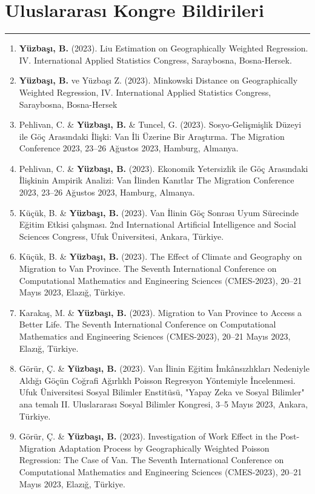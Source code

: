 \documentclass[10pt,a4paper]{article}
\newcommand{\NewPart}[2]{%
	\Needspace{7\baselineskip}%
	\vspace{0.45em}%
	\section*{\sffamily\large\bfseries\color{MidnightBlue}#1 #2}%
	\vspace{-0.7em}\noindent\color{MidnightBlue}\rule{\textwidth}{0.55pt}\color{Black}\vspace{0.25em}}
\newenvironment{etaremune}{\begin{enumerate}}{\end{enumerate}}
\begin{document}
\NewPart{Uluslararası Kongre Bildirileri}{}

\begin{etaremune}
\renewcommand{\theenumi}{C2-\arabic{enumi}}



\item {\bf Y\"{u}zba\c{s}{\i}, B.} (2023). Liu Estimation on Geographically Weighted Regression. IV. International Applied Statistics Congress, Saraybosna, Bosna-Hersek.

\item {\bf Y\"{u}zba\c{s}{\i}, B.} ve Yüzbaşı Z. (2023). Minkowski Distance on Geographically Weighted Regression, IV. International Applied Statistics Congress, Saraybosna, Bosna-Hersek
\item Pehlivan, C. \& {\bf Y\"{u}zba\c{s}{\i}, B.} \& Tuncel, G.  (2023). Sosyo-Gelişmişlik Düzeyi ile Göç Arasındaki İlişki: Van İli Üzerine Bir Araştırma. The Migration Conference 2023, 23--26 Ağustos 2023, Hamburg, Almanya.
\item Pehlivan, C. \& {\bf Y\"{u}zba\c{s}{\i}, B.} (2023). Ekonomik Yetersizlik ile Göç Arasındaki İlişkinin Ampirik Analizi: Van İlinden Kanıtlar The Migration Conference 2023, 23--26 Ağustos 2023, Hamburg, Almanya.
\item Küçük, B. \& {\bf Y\"{u}zba\c{s}{\i}, B.} (2023). Van İlinin Göç Sonrası Uyum Sürecinde Eğitim Etkisi çalışması. 2nd International Artificial Intelligence and Social Sciences Congress, Ufuk Üniversitesi, Ankara, Türkiye.
\item Küçük, B. \& {\bf Y\"{u}zba\c{s}{\i}, B.} (2023). The Effect of Climate and Geography on Migration to Van Province. The Seventh International Conference on Computational Mathematics and Engineering Sciences (CMES-2023), 20--21 Mayıs 2023, Elazığ, Türkiye.
\item Karakaş, M. \& {\bf Y\"{u}zba\c{s}{\i}, B.} (2023). Migration to Van Province to Access a Better Life. The Seventh International Conference on Computational Mathematics and Engineering Sciences (CMES-2023), 20--21 Mayıs 2023, Elazığ, Türkiye.
\item Görür, Ç. \& {\bf Y\"{u}zba\c{s}{\i}, B.} (2023). Van İlinin Eğitim İmkânsızlıkları Nedeniyle Aldığı Göçün Coğrafi Ağırlıklı Poisson Regresyon Yöntemiyle İncelenmesi. Ufuk Üniversitesi Sosyal Bilimler Enstitüsü, "Yapay Zeka ve Sosyal Bilimler" ana temalı II. Uluslararası Sosyal Bilimler Kongresi, 3--5 Mayıs 2023, Ankara, Türkiye.
\item Görür, Ç. \& {\bf Y\"{u}zba\c{s}{\i}, B.} (2023). Investigation of Work Effect in the Post-Migration Adaptation Process by Geographically Weighted Poisson Regression: The Case of Van. The Seventh International Conference on Computational Mathematics and Engineering Sciences (CMES-2023), 20--21 Mayıs 2023, Elazığ, Türkiye.

\end{etaremune}
\end{document}
